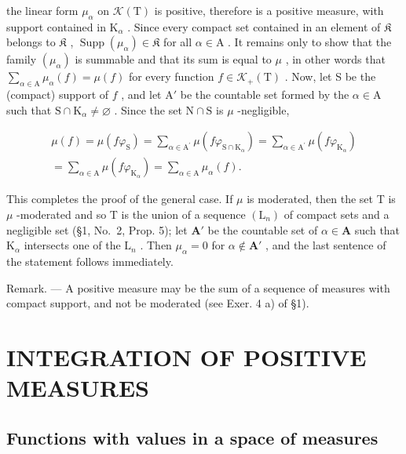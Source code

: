 the linear form \(\mu_{\alpha}\) on \(\mathcal{K}(\mathrm{T})\) is positive, therefore is a positive measure, with support contained in \(\mathrm{K}_{\alpha}\) . Since every compact set contained in an element of \(\mathfrak{K}\) belongs to \(\mathfrak{K}\) , \(\operatorname{Supp}(\mu_{\alpha}) \in \mathfrak{K}\) for all \(\alpha \in \mathrm{A}\) . It remains only to show that the family \((\mu_{\alpha})\) is summable and that its sum is equal to \(\mu\) , in other words that \(\sum_{\alpha \in \mathrm{A}} \mu_{\alpha}(f) = \mu(f)\) for every function \(f \in \mathcal{K}_{+}(\mathrm{T})\) . Now, let S be the (compact) support of \(f\) , and let \(\mathrm{A}'\) be the countable set formed by the \(\alpha \in \mathrm{A}\) such that \(\mathrm{S} \cap \mathrm{K}_{\alpha} \neq \varnothing\) . Since the set \(\mathrm{N} \cap \mathrm{S}\) is \(\mu\) -negligible,

\[
\begin{array}{c} \mu (f) = \mu (f \varphi_ {\mathrm{S}}) = \sum_ {\alpha \in \mathrm{A} ^ {\prime}} \mu (f \varphi_ {\mathrm{S} \cap \mathrm{K} _ {\alpha}}) = \sum_ {\alpha \in \mathrm{A} ^ {\prime}} \mu (f \varphi_ {\mathrm{K} _ {\alpha}}) \\ = \sum_ {\alpha \in \mathrm{A}} \mu (f \varphi_ {\mathrm{K} _ {\alpha}}) = \sum_ {\alpha \in \mathrm{A}} \mu_ {\alpha} (f). \end{array}
\]

This completes the proof of the general case. If \(\mu\) is moderated, then the set T is \(\mu\) -moderated and so T is the union of a sequence \((\mathrm{L}_n)\) of compact sets and a negligible set (§1, No.~2, Prop. 5); let \(\mathbf{A}'\) be the countable set of \(\alpha \in \mathbf{A}\) such that \(\mathrm{K}_{\alpha}\) intersects one of the \(\mathrm{L}_n\) . Then \(\mu_{\alpha} = 0\) for \(\alpha \notin \mathbf{A}'\) , and the last sentence of the statement follows immediately.

Remark. --- A positive measure may be the sum of a sequence of measures with compact support, and not be moderated (see Exer. 4 a) of §1).

\section{INTEGRATION OF POSITIVE MEASURES}

\subsection{Functions with values in a space of measures}

